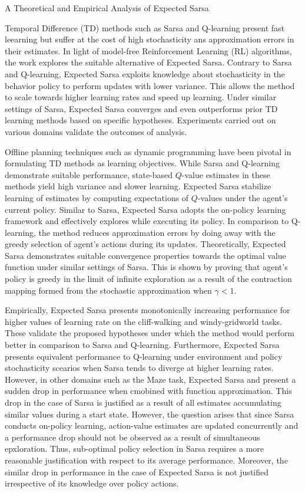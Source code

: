 \documentclass[11pt,letterpaper]{article}
\begin{document}
\begin{center}
  \large{A Theoretical and Empirical Analysis of Expected Sarsa}
\end{center}

Temporal Difference (TD) methods such as Sarsa and Q-learning present fast leearning but suffer at the cost of high stochasticity ans approximation errors in their estimates. In light of model-free Reinforcement Learning (RL) algorithms, the work explores the suitable alternative of Expected Sarsa. Contrary to Sarsa and Q-learning, Expected Sarsa exploits knowledge about stochasticity in the behavior policy to perform updates with lower variance. This allows the method to scale towards higher learning rates and speed up learning. Under similar settings of Sarsa, Expected Sarsa converges and even outperforms prior TD learning methods based on specific hypotheses. Experiments carried out on various domains validate the outcomes of analysis.

Offline planning techniques such as dynamic programming have been pivotal in formulating TD methods as learning objectives. While Sarsa and Q-learning demonstrate suitable performance, state-based $Q$-value estimates in these methods yield high variance and slower learning. Expected Sarsa stabilize learning of estimates by computing expectations of $Q$-values under the agent's current policy. Similar to Sarsa, Expected Sarsa adopts the on-policy learning framework and effectively explores while executing its policy. In comparison to Q-learning, the method reduces approximation errors by doing away with the greedy selection of agent's actions during its updates. Theoretically, Expected Sarsa demonstrates suitable convergence properties towards the optimal value function under similar settings of Sarsa. This is shown by proving that agent's policy is greedy in the limit of infinite exploration as a result of the contraction mapping formed from the stochastic approximation when $\gamma < 1$. 

Empirically, Expected Sarsa presents monotonically increasing performance for higher values of learning rate on the cliff-walking and windy-gridworld tasks. These validate the proposed hypotheses under which the method would perform better in comparison to Sarsa and Q-learning. Furthermore, Expected Sarsa presents equivalent performance to Q-learning under environment and policy stochasticity scearios when Sarsa tends to diverge at higher learning rates. However, in other domains such as the Maze task, Expected Sarsa and present a sudden drop in performance when cmobined with function approximation. This drop in the case of Sarsa is justified as a result of all estimates accumulating similar values during a start state. However, the question arises that since Sarsa conducts on-policy learning, action-value estimates are updated concurrently and a performance drop should not be observed as a result of simultaneous epxloration. Thus, sub-optimal policy selection in Sarsa requires a more reasonable justification with respect to its average performance. Moreover, the similar drop in performance in the case of Expected Sarsa is not justified irrespective of its knowledge over policy actions. 
\end{document}
